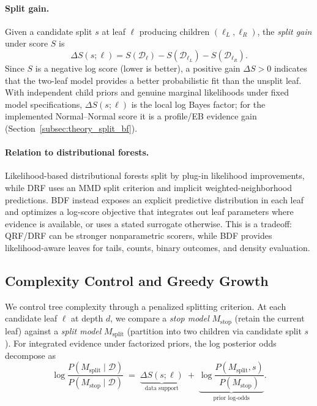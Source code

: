 \documentclass[10pt]{article} %
\begin{document}
\paragraph{Split gain.}
Given a candidate split $s$ at leaf $\ell$ producing children $(\ell_L,\ell_R)$, the \emph{split gain} under score $S$ is
\begin{equation}\label{eq:split_gain}
\Delta S(s;\ell)
=
S(\mathcal{D}_\ell) - S(\mathcal{D}_{\ell_L}) - S(\mathcal{D}_{\ell_R}).
\end{equation}
Since $S$ is a negative log score (lower is better), a positive gain $\Delta S > 0$ indicates that the two-leaf model provides a better probabilistic fit than the unsplit leaf. With independent child priors and genuine marginal likelihoods under fixed model specifications, $\Delta S(s;\ell)$ is the local log Bayes factor; for the implemented Normal--Normal score it is a profile/EB evidence gain (Section~\ref{subsec:theory_split_bf}).

\paragraph{Relation to distributional forests.}
Likelihood-based distributional forests \citep{schlosser2019distributional} split by plug-in likelihood improvements, while DRF \citep{cevid2022distributional} uses an MMD split criterion and implicit weighted-neighborhood predictions. BDF instead exposes an explicit predictive distribution in each leaf and optimizes a log-score objective that integrates out leaf parameters where evidence is available, or uses a stated surrogate otherwise. This is a tradeoff: QRF/DRF can be stronger nonparametric scorers, while BDF provides likelihood-aware leaves for tails, counts, binary outcomes, and density evaluation.


\subsection{Complexity Control and Greedy Growth}\label{subsec:complexity_growth}

We control tree complexity through a penalized splitting criterion. At each candidate leaf $\ell$ at depth $d$, we compare a \emph{stop model} $M_{\mathrm{stop}}$ (retain the current leaf) against a \emph{split model} $M_{\mathrm{split}}$ (partition into two children via candidate split $s$). For integrated evidence under factorized priors, the log posterior odds decompose as
\begin{equation}\label{eq:posterior_odds}
\log \frac{P(M_{\mathrm{split}} \mid \mathcal{D})}{P(M_{\mathrm{stop}} \mid \mathcal{D})}
\;=\;
\underbrace{\Delta S(s;\ell)}_{\text{data support}}
\;+\;
\underbrace{\log \frac{P(M_{\mathrm{split}}, s)}{P(M_{\mathrm{stop}})}}_{\text{prior log-odds}}.
\end{equation}
\end{document}
